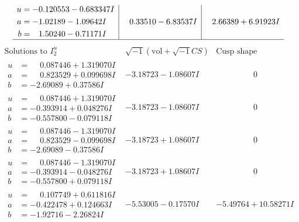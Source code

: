 \documentclass[1p]{elsarticle_modified}
\theoremstyle{definition}
\newcommand{\I}{\sqrt{-1}}
\begin{document}
$$\begin{array}{c|c|c}
\begin{aligned}
u &= -0.120553 - 0.683347 I \\
a &= -1.02189 - 1.09642 I \\
b &= \phantom{-}1.50240 - 0.71171 I\end{aligned}
 & \phantom{-}0.33510 - 6.83537 I & \phantom{-}2.66389 + 6.91923 I\\
 \hline 
 \end{array}$$\newpage$$\begin{array}{c|c|c}  
\text{Solutions to }I^u_{2}& \I (\text{vol} + \sqrt{-1}CS) & \text{Cusp shape}\\
 \hline 
\begin{aligned}
u &= \phantom{-}0.087446 + 1.319070 I \\
a &= \phantom{-}0.823529 + 0.099698 I \\
b &= -2.69089 + 0.37586 I\end{aligned}
 & -3.18723 - 1.08607 I & \phantom{-0.000000 } 0 \\ \hline\begin{aligned}
u &= \phantom{-}0.087446 + 1.319070 I \\
a &= -0.393914 + 0.048276 I \\
b &= -0.557800 - 0.079118 I\end{aligned}
 & -3.18723 - 1.08607 I & \phantom{-0.000000 } 0 \\ \hline\begin{aligned}
u &= \phantom{-}0.087446 - 1.319070 I \\
a &= \phantom{-}0.823529 - 0.099698 I \\
b &= -2.69089 - 0.37586 I\end{aligned}
 & -3.18723 + 1.08607 I & \phantom{-0.000000 } 0 \\ \hline\begin{aligned}
u &= \phantom{-}0.087446 - 1.319070 I \\
a &= -0.393914 - 0.048276 I \\
b &= -0.557800 + 0.079118 I\end{aligned}
 & -3.18723 + 1.08607 I & \phantom{-0.000000 } 0 \\ \hline\begin{aligned}
u &= \phantom{-}0.107749 + 0.611816 I \\
a &= -0.422478 + 0.124663 I \\
b &= -1.92716 - 2.26824 I\end{aligned}
 & -5.53005 - 0.17570 I & -5.49764 + 10.58271 I \\ \hline\begin{aligned}

\end{aligned}
\end{array}$$
\end{document}
